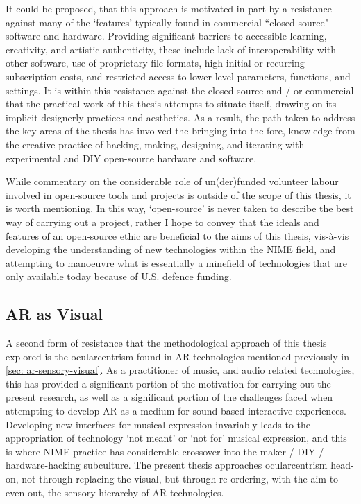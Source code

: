 It could be proposed, that this approach is motivated in part by a resistance against many of the `features' typically found in commercial ``closed-source" software and hardware. Providing significant barriers to accessible learning, creativity, and artistic authenticity, these include lack of interoperability with other software, use of proprietary file formats, high initial or recurring subscription costs, and restricted access to lower-level parameters, functions, and settings. It is within this resistance against the closed-source and / or commercial that the practical work of this thesis attempts to situate itself, drawing on its implicit designerly practices and aesthetics. As a result, the path taken to address the key areas of the thesis has involved the bringing into the fore, knowledge from the creative practice of hacking, making, designing, and iterating with experimental and DIY open-source hardware and software.

While commentary on the considerable role of un(der)funded volunteer labour involved in open-source tools and projects is outside of the scope of this thesis, it is worth mentioning. In this way, `open-source' is never taken to describe the best way of carrying out a project, rather I hope to convey that the ideals and features of an open-source ethic are beneficial to the aims of this thesis, vis-à-vis developing the understanding of new technologies within the NIME field, and attempting to manoeuvre what is essentially a minefield of technologies that are only available today because of U.S. defence funding.

\subsection{AR as Visual} \label{sec: method-resistance-ocularcentrism}
A second form of resistance that the methodological approach of this thesis explored is the ocularcentrism found in AR technologies mentioned previously in \autoref{sec: ar-sensory-visual}. As a practitioner of music, and audio related technologies, this has provided a significant portion of the motivation for carrying out the present research, as well as a significant portion of the challenges faced when attempting to develop AR as a medium for sound-based interactive experiences. Developing new interfaces for musical expression invariably leads to the appropriation of technology `not meant' or `not for' musical expression, and this is where NIME practice has considerable crossover into the maker / DIY / hardware-hacking subculture. The present thesis approaches ocularcentrism head-on, not through replacing the visual, but through re-ordering, with the aim to even-out, the sensory hierarchy of AR technologies. 

